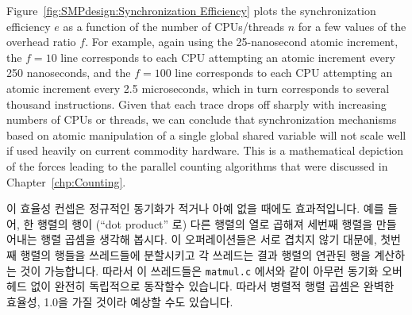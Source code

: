 Figure~\ref{fig:SMPdesign:Synchronization Efficiency} plots the synchronization
efficiency $e$ as a function of the number of CPUs/threads $n$ for
a few values of the overhead ratio $f$.
For example, again using the 25-nanosecond atomic increment, the
$f=10$ line corresponds to each CPU attempting an atomic increment
every 250 nanoseconds, and the $f=100$ line corresponds to each
CPU attempting an atomic increment every 2.5 microseconds,
which in turn corresponds to several thousand instructions.
Given that each trace drops off sharply with increasing numbers of
CPUs or threads, we can conclude that
synchronization mechanisms based on
atomic manipulation of a single global shared variable will not
scale well if used heavily on current commodity hardware.
This is a mathematical depiction of the forces leading to the parallel
counting algorithms that were discussed in Chapter~\ref{chp:Counting}.
\fi

이 효율성 컨셉은 정규적인 동기화가 적거나 아예 없을 때에도 효과적입니다.
예를 들어, 한 행렬의 행이 (``dot product'' 로) 다른 행렬의 열로 곱해져 세번째
행렬을 만들어내는 행렬 곱셈을 생각해 봅시다.
이 오퍼레이션들은 서로 겹치지 않기 대문에, 첫번째 행렬의 행들을 쓰레드들에
분할시키고 각 쓰레드는 결과 행렬의 연관된 행을 계산하는 것이 가능합니다.
따라서 이 쓰레드들은 \texttt{matmul.c} 에서와 같이 아무런 동기화 오버헤드 없이
완전히 독립적으로 동작할수 있습니다.
따라서 병렬적 행렬 곱셈은 완벽한 효율성, 1.0을 가질 것이라 예상할 수도
있습니다.


